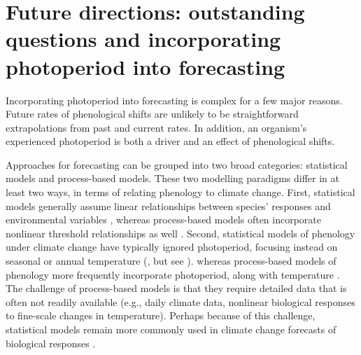 \documentclass{article}
\begin{document}
\section*{Future directions: outstanding questions and incorporating photoperiod into forecasting}
\par  Incorporating photoperiod into forecasting is complex for a few major reasons. Future rates of phenological shifts are unlikely to be straightforward extrapolations from past and current rates. In addition, an organism's experienced photoperiod is both a driver and an effect of phenological shifts. 
\par Approaches for forecasting can be grouped into two broad categories: statistical models and process-based models. These two modelling paradigms differ in at least two ways, in terms of relating phenology to climate change. First, statistical models generally assume linear relationships between species' responses and environmental variables \citep[e.g., ][]{flynn2018,van2007,ibanez2010}, whereas process-based models often incorporate nonlinear threshold relationships as well \citep[e.g.][]{chuine2001,morin2009,xie1989}. Second, statistical models of phenology under climate change have typically ignored photoperiod, focusing instead on seasonal or annual temperature (\citet[e.g.][]{van2007,ibanez2010,diez2012}, but see \citet{richardson2013}). %
whereas process-based models of phenology more frequently incorporate photoperiod, along with temperature \citep{duputie2015,morin2009,xie1989,zhao2013}. The challenge of process-based models is that they require detailed data that is often not readily available (e.g., daily climate data, nonlinear biological responses to fine-scale changes in temperature). Perhaps because of this challenge, statistical models remain more commonly used in climate change forecasts of biological responses \citep[e.g.,][]{Basler:2012, zhu2012,garcia2016,van2007,ibanez2010,diez2012}.
\end{document}
